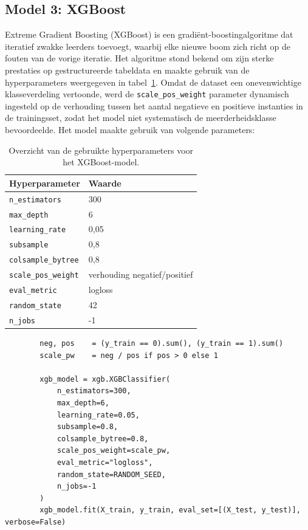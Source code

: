 \subsection{Model 3: XGBoost}
Extreme Gradient Boosting (XGBoost) is een gradiënt-boostingalgoritme dat iteratief zwakke leerders toevoegt, waarbij elke nieuwe boom zich richt op de fouten van de vorige iteratie. Het algoritme stond bekend om zijn sterke 
prestaties op gestructureerde tabeldata en maakte gebruik van de hyperparameters weergegeven in tabel~\ref{tab:xgb-params}. Omdat de dataset een onevenwichtige klasseverdeling vertoonde, werd de \texttt{scale\_pos\_weight} parameter dynamisch ingesteld op de verhouding tussen het aantal negatieve en positieve instanties in de trainingsset, zodat het model niet systematisch de meerderheidsklasse bevoordeelde. Het model maakte gebruik van volgende parameters:

\begin{table}[H]
    \centering
    \small
    \begin{tabular}{ll}
        \toprule
        \textbf{Hyperparameter} & \textbf{Waarde} \\
        \midrule
        \texttt{n\_estimators}      & 300 \\
        \texttt{max\_depth}         & 6 \\
        \texttt{learning\_rate}     & 0,05 \\
        \texttt{subsample}          & 0,8 \\
        \texttt{colsample\_bytree}  & 0,8 \\
        \texttt{scale\_pos\_weight} & verhouding negatief/positief \\
        \texttt{eval\_metric}       & logloss \\
        \texttt{random\_state}      & 42 \\
        \texttt{n\_jobs}            & -1 \\
        \bottomrule
    \end{tabular}
    \caption[XGBoost hyperparameters]{%
        \label{tab:xgb-params}Overzicht van de gebruikte hyperparameters voor het XGBoost-model.}
\end{table}

\begin{listing}[H]
    \begin{verbatim}
        neg, pos    = (y_train == 0).sum(), (y_train == 1).sum()
        scale_pw    = neg / pos if pos > 0 else 1
        
        xgb_model = xgb.XGBClassifier(
            n_estimators=300,
            max_depth=6,
            learning_rate=0.05,
            subsample=0.8,
            colsample_bytree=0.8,
            scale_pos_weight=scale_pw,
            eval_metric="logloss",
            random_state=RANDOM_SEED,
            n_jobs=-1
        )
        xgb_model.fit(X_train, y_train, eval_set=[(X_test, y_test)], verbose=False)
    \end{verbatim}
    \caption[Training XGBoost]{Initialisatie en training van het XGBoost model met dynamisch berekende klassengewichten.}
\end{listing}

